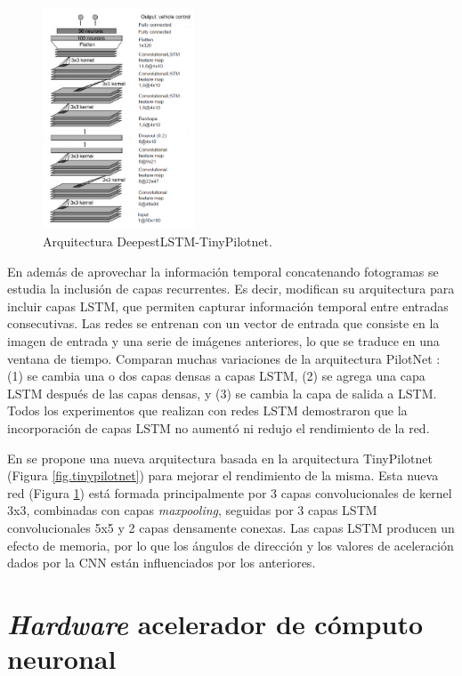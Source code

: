 \begin{figure}
\begin{center}
	\includegraphics[width=0.4\textwidth]{img/deepestlstm.png}
   \caption{Arquitectura DeepestLSTM-TinyPilotnet.}
	\label{fig.deepestlstm}
\end{center}
\end{figure}

En \cite{pixels} además de aprovechar la información temporal concatenando fotogramas se estudia la inclusión de capas recurrentes. Es decir, modifican su arquitectura para incluir capas LSTM, que permiten capturar información temporal entre entradas consecutivas. Las redes se entrenan con un vector de entrada que consiste en la imagen de entrada y una serie de imágenes anteriores, lo que se traduce en una ventana de tiempo. Comparan muchas variaciones de la arquitectura PilotNet \cite{end2end}: (1) se cambia una o dos capas densas a capas LSTM, (2) se agrega una capa LSTM después de las capas densas, y (3) se cambia la capa de salida a LSTM. Todos los experimentos que realizan con redes LSTM demostraron que la incorporación de capas LSTM no aumentó ni redujo el rendimiento de la red.

En \cite{self-driving} se propone una nueva arquitectura basada en la arquitectura TinyPilotnet (Figura \ref{fig.tinypilotnet}) para mejorar el rendimiento de la misma. Esta nueva red (Figura \ref{fig.deepestlstm}) está formada principalmente por 3 capas convolucionales de kernel 3x3, combinadas con capas \textit{maxpooling}, seguidas por 3 capas LSTM convolucionales 5x5 y 2 capas densamente conexas. Las capas LSTM producen un efecto de memoria, por lo que los ángulos de dirección y los valores de aceleración dados por la CNN están influenciados por los anteriores. 

\section{\textit{Hardware} acelerador de cómputo neuronal}

